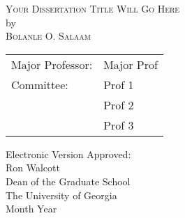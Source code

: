 \documentclass[12pt, notitlepage, twoside]{report}
\begin{document}
\newcommand{\doctitle}{Your Dissertation Title Will Go Here}
\newcommand{\docauthor}{Bolanle O. Salaam}



%



\newcommand{\degreesearned}{%
B.S., University of Georgia, 2018\\
  Enter only degrees already completed. Follow example above\\
  If degree was obtained outside of the US, the country \\
  of the school and date obtained will need to be provided.
}%

\newcommand{\degreetype}{[Dissertation or Thesis]}
\newcommand{\degreetitle}{[Doctor or Master]}
\newcommand{\degreename}{[Degree Name]}
\newcommand{\degreeyear}{2020}
\maketitlepage





\newpage
\thispagestyle{empty}
\vspace*{18pt}
\begin{center}
  \textsc{\doctitle}\\[18pt]
  by\\[18pt]
  \textsc{\docauthor}
\end{center}
\vfill

\begin{flushright}
  \begin{tabular}{ll}
    Major Professor: & Major Prof \\ [8pt]
    Committee: & Prof 1 \\
    & Prof 2 \\
    & Prof 3 \\
  \end{tabular}
\end{flushright}

\vspace*{3cm}

\begin{flushleft}
  Electronic Version Approved:\\[12pt]
  Ron Walcott\\
  Dean of the Graduate School\\
  The University of Georgia\\
  Month Year
\end{flushleft}
\vspace*{1.5cm}
\end{document}
